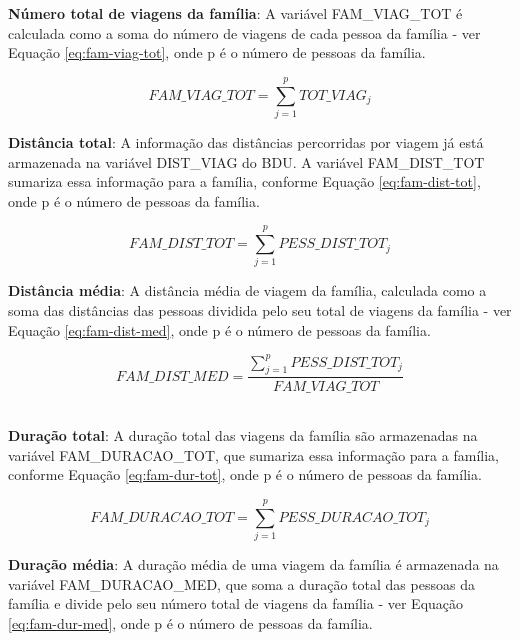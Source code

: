 \begin{compactitem}
\item \textbf{Número total de viagens da família}: A variável FAM_VIAG_TOT é calculada como a soma do número de viagens de cada pessoa da família - ver Equação \eqref{eq:fam-viag-tot}, onde p é o número de pessoas da família.

\begin{equation}\label{eq:fam-viag-tot}
FAM\_VIAG\_TOT=\displaystyle\sum_{j=1}^{p}TOT\_VIAG_{j}
\end{equation}

\item \textbf{Distância total}:  A informação das distâncias percorridas por viagem já está armazenada na variável DIST_VIAG do BDU. A variável FAM_DIST_TOT sumariza essa informação para a família, conforme Equação \eqref{eq:fam-dist-tot}, onde p é o número de pessoas da família.

\begin{equation}\label{eq:fam-dist-tot}
FAM\_DIST\_TOT=\displaystyle\sum_{j=1}^{p}PESS\_DIST\_TOT_{j}
\end{equation}

\item \textbf{Distância média}: A distância média de viagem da família, calculada como a soma das distâncias das pessoas dividida pelo seu total de viagens da família - ver Equação \eqref{eq:fam-dist-med}, onde p é o número de pessoas da família.

\begin{equation}\label{eq:fam-dist-med}
FAM\_DIST\_MED=\frac{\displaystyle\sum_{j=1}^{p}PESS\_DIST\_TOT_{j}}{FAM\_VIAG\_TOT}
\end{equation}\\

\item \textbf{Duração total}: A duração total das viagens da família são armazenadas na variável FAM_DURACAO_TOT, que sumariza essa informação para a família, conforme Equação \eqref{eq:fam-dur-tot}, onde p é o número de pessoas da família.

\begin{equation}\label{eq:fam-dur-tot}
FAM\_DURACAO\_TOT=\displaystyle\sum_{j=1}^{p}PESS\_DURACAO\_TOT_{j}
\end{equation}

\item \textbf{Duração média}: A duração média de uma viagem da família é armazenada na variável FAM_DURACAO_MED, que soma a duração total das pessoas da família e divide pelo seu número total de viagens da família - ver Equação \eqref{eq:fam-dur-med}, onde p é o número de pessoas da família.


\end{compactitem}
